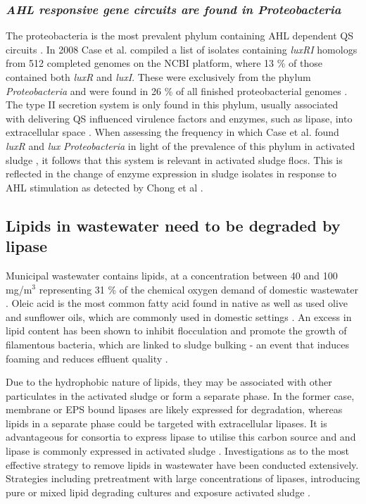 \documentclass[11pt]{article}
\begin{document}
\subsubsection{\emph{AHL responsive gene circuits are found in Proteobacteria}}
The proteobacteria is the most prevalent phylum containing AHL dependent QS circuits \cite{gelencser_12}. In 2008 Case et al. compiled a list of isolates containing \emph{luxRI} homologs from 512 completed genomes on the NCBI platform, where 13 \% of those contained both \emph{luxR} and \emph{luxI}. These were exclusively from the phylum \emph{Proteobacteria} and were found in 26 \% of all finished proteobacterial genomes \cite{case_08}.
The type II secretion system is only found in this phylum, usually associated with delivering QS influenced virulence factors and enzymes, such as lipase, into extracellular space \cite{sandkvist2001}. 
When assessing the frequency in which Case et al. found \emph{luxR} and \emph{lux} \emph{Proteobacteria} \cite{case_08} in light of the prevalence of this phylum in activated sludge \cite{Wagner_02,Hesham_11}, it follows that this system is relevant in activated sludge flocs. This is reflected in the change of enzyme expression in sludge isolates in response to AHL stimulation as detected by Chong et al \cite{Chong_12}. 

\subsection{Lipids in wastewater need to be degraded by lipase}
Municipal wastewater contains lipids, at a concentration between 40 and 100 mg/m$^{3}$ \cite{Forster_92} representing 31 \% of the chemical oxygen demand of domestic wastewater \cite{Raunkjaer_94}. Oleic acid is the most common fatty acid found in native as well as used olive and sunflower oils, which are commonly used in domestic settings \cite{haba2000isolation}.  An excess in lipid content has been shown to inhibit flocculation and promote the growth of filamentous bacteria, which are linked to sludge bulking - an event that induces foaming and reduces effluent quality \cite{Forster_92}.

Due to the hydrophobic nature of lipids, they may be associated with other particulates in the activated sludge or form a separate phase. In the former case, membrane or EPS bound lipases are likely expressed for degradation, whereas lipids in a separate phase could be targeted with extracellular lipases. It is advantageous for consortia to express lipase to utilise this carbon source and and lipase is commonly expressed in activated sludge \cite{gessesse2003lipase}. Investigations as to the most effective strategy to remove lipids in wastewater have been conducted extensively. Strategies including pretreatment with large concentrations of lipases, introducing pure or mixed lipid degrading cultures and exposure activated sludge \cite{Wakelin_97}. %
\end{document}
